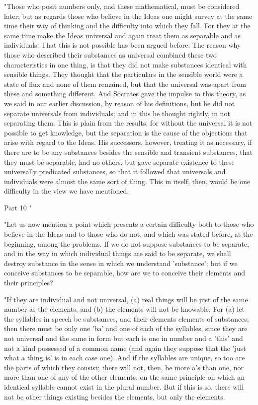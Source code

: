 "Those who posit numbers only, and these mathematical, must be considered
later; but as regards those who believe in the Ideas one might survey
at the same time their way of thinking and the difficulty into which
they fall. For they at the same time make the Ideas universal and
again treat them as separable and as individuals. That this is not
possible has been argued before. The reason why those who described
their substances as universal combined these two characteristics in
one thing, is that they did not make substances identical with sensible
things. They thought that the particulars in the sensible world were
a state of flux and none of them remained, but that the universal
was apart from these and something different. And Socrates gave the
impulse to this theory, as we said in our earlier discussion, by reason
of his definitions, but he did not separate universals from individuals;
and in this he thought rightly, in not separating them. This is plain
from the results; for without the universal it is not possible to
get knowledge, but the separation is the cause of the objections that
arise with regard to the Ideas. His successors, however, treating
it as necessary, if there are to be any substances besides the sensible
and transient substances, that they must be separable, had no others,
but gave separate existence to these universally predicated substances,
so that it followed that universals and individuals were almost the
same sort of thing. This in itself, then, would be one difficulty
in the view we have mentioned. 

Part 10 "

"Let us now mention a point which presents a certain difficulty both
to those who believe in the Ideas and to those who do not, and which
was stated before, at the beginning, among the problems. If we do
not suppose substances to be separate, and in the way in which individual
things are said to be separate, we shall destroy substance in the
sense in which we understand 'substance'; but if we conceive substances
to be separable, how are we to conceive their elements and their principles?

"If they are individual and not universal, (a) real things will be
just of the same number as the elements, and (b) the elements will
not be knowable. For (a) let the syllables in speech be substances,
and their elements elements of substances; then there must be only
one 'ba' and one of each of the syllables, since they are not universal
and the same in form but each is one in number and a 'this' and not
a kind possessed of a common name (and again they suppose that the
'just what a thing is' is in each case one). And if the syllables
are unique, so too are the parts of which they consist; there will
not, then, be more a's than one, nor more than one of any of the other
elements, on the same principle on which an identical syllable cannot
exist in the plural number. But if this is so, there will not be other
things existing besides the elements, but only the elements.

